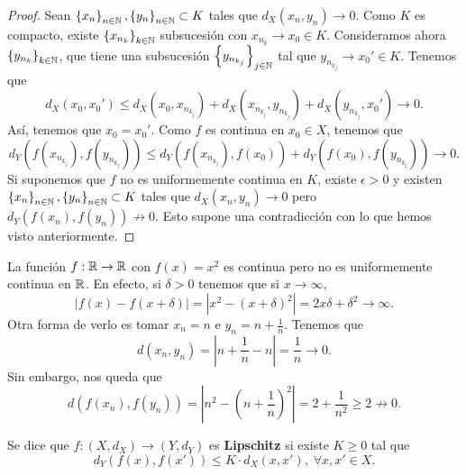 \begin{proof}
	Sean $\displaystyle \left\{ x_{n}\right\} _{n\in\mathbb{N}}, \left\{ y_{n}\right\} _{n\in\mathbb{N}} \subset K $ tales que $\displaystyle d _{X}\left(x_{n}, y_{n}\right) \to 0 $. Como $\displaystyle K $ es compacto, existe $\displaystyle \left\{ x_{n_{k}}\right\} _{k \in \mathbb{N}}  $ subsucesión con $\displaystyle x_{n_{k}} \to x_{0} \in K$. Consideramos ahora $\displaystyle \left\{ y_{n_{k}}\right\}_{k \in \mathbb{N}}  $, que tiene una subsucesión $\displaystyle \left\{ y_{n_{k_{j}}}\right\} _{j \in \mathbb{N}} $ tal que $\displaystyle y_{n_{k_{j}}} \to x_{0}' \in K $. Tenemos que
	\[d _{X}\left(x_{0}, x_{0}'\right) \leq d _{X}\left(x_{0}, x_{n_{k_{j}}}\right) + d _{X}\left(x_{n_{k_{j}}}, y_{n_{k_{j}}}\right)+ d _{X}\left(y_{n_{k_{j}}}, x_{0}'\right) \to 0 .\]
	Así, tenemos que $\displaystyle x_{0} = x_{0}' $. Como $\displaystyle f $ es continua en $\displaystyle x_{0} \in X $, tenemos que 
	\[ d _{Y}\left(f\left(x_{n_{k_{j}}}\right), f\left(y_{n_{k_{j}}}\right)\right) \leq d _{Y}\left(f\left(x_{n_{k_{j}}}\right), f\left(x_{0}\right)\right) + d _{Y}\left(f\left(x_{0}\right), f\left(y_{n_{k_{j}}}\right)\right) \to 0 .\]
	Si suponemos que $\displaystyle f $ no es uniformemente continua en $\displaystyle K $, existe $\displaystyle \epsilon > 0 $ y existen $\displaystyle \left\{ x_{n}\right\} _{n\in\mathbb{N}}, \left\{ y_{n}\right\} _{n\in\mathbb{N}} \subset K $ tales que $\displaystyle d _{X}\left(x_{n}, y_{n}\right)\to 0 $ pero $\displaystyle d _{Y}\left(f\left(x_{n}\right), f\left(y_{n}\right)\right) \not \to 0 $. Esto supone una contradicción con lo que hemos visto anteriormente. 
\end{proof}
\begin{eg}
La función $\displaystyle f: \mathbb{R} \to \mathbb{R}  $ con $\displaystyle f\left(x\right) = x^{2} $ es continua pero no es uniformemente continua en $\displaystyle \mathbb{R} $. En efecto, si $\displaystyle \delta > 0 $ tenemos que si $\displaystyle x \to \infty $,
\[ \left|f\left(x\right)-f\left(x + \delta \right)\right| = \left|x^{2} - \left(x+ \delta \right)^{2}\right| = 2x\delta + \delta ^{2} \to \infty .\]
Otra forma de verlo es tomar $\displaystyle x_{n} = n $ e $\displaystyle y_{n} = n + \frac{1}{n} $. Tenemos que
\[ d\left(x_{n}, y_{n}\right) = \left|n + \frac{1}{n} - n\right| = \frac{1}{n} \to 0 .\]
Sin embargo, nos queda que
\[ d\left(f\left(x_{n}\right), f\left(y_{n}\right)\right) = \left|n^{2}-\left(n+\frac{1}{n}\right)^{2}\right| = 2 + \frac{1}{n^{2}} \geq 2 \not \to 0 .\]
\end{eg}
\begin{definition}
Se dice que $\displaystyle f : \left(X, d _{X}\right) \to \left(Y, d _{Y}\right) $ es \textbf{Lipschitz} si existe $\displaystyle K \geq 0 $ tal que 
\[d _{Y}\left(f\left(x\right), f\left(x'\right)\right) \leq K \cdot d _{X}\left(x,x'\right), \; \forall x,x' \in X .\]
\end{definition}

